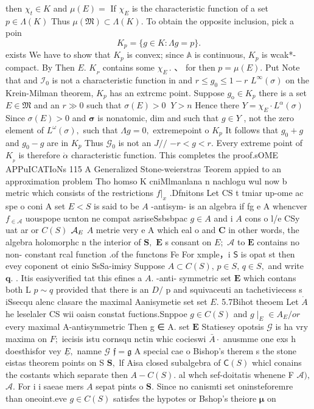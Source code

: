then $\scriptstyle\chi_{t}\in K$ and $\mu(E)=$ If $\chi_{E}$ is the characteristic function of a set $p\in\Lambda(K)$ Thus $\mu({\mathfrak{M}})\subset{\Lambda}(K).$ To obtain the opposite inclusion, pick a poin $$ K_{p}=\{g\in K\colon\Lambda g=p\}. $$ exists We have to show that $K_{p}$ is convex; since $\mathbb{A}$ is continuous, $K_{p}$ is wcak*-compact. By Then $\textstyle E.$ $K_{\!_{P}}$ contains some $\chi_{E}\,.$ 、 for then $p=\mu(E).$ Put Note that and ${\mathcal{I}}_{0}$ is not a characteristic function in and $r\leq g_{0}\leq1-r$ $L^{\infty}(\sigma)$ on the Krein-Milman theorem, $K_{p}$ has an extrcmc point. Suppose $g_{\mathrm{o}}\in K_{p}$ there is a set $E\in{\mathfrak{M}}$ and an $\scriptstyle{r\gg0}$ such that $\sigma(E)>0$ $\ Y>n$ Hence there $Y=\chi_{E}\cdot L^{\alpha}(\sigma)$ Since $\sigma(E)>0$ and $\textstyle{\boldsymbol{\sigma}}$ is nonatomic, dim and such that $g\in Y$ , not the zero element of $L^{\omega}(\sigma),$ such that $\Lambda g=0,$ extremepoint o $K_{p}$ It follows that $g_{0}+g$ and $g_{0}-g$ are in $K_{p}$ Thus ${\mathcal{G}}_{0}$ is not an $J/{\big/}$ $-r<g<r.$ Every extreme point of $K_{\!_{p}}$ is therefore $\scriptstyle{\dot{\alpha}}$ characteristic function. This completes the proof.sOME APPuICATIoNs 115 A Generalized Stone-weierstras Teorem appied to an approximation problem Tho homso K cniMlmanlana n nachlogu wul now b metric which consists of the restrictions $f|_{x}$ .Dfnitons Let CS t tmiar up-ome ac spe o coni A set $E<S$ is said to be $\textstyle A$ -antisym- is an algebra if fg e A whencver $f_{\in{\mathcal{A}}}$ uouspope ucnton ne compat asriseSsbsbpac $g\in A$ and i $\textstyle A$ cons o l/e CSy uat ar or $C(S)$ ${\cal A}_{E}$ $\textstyle{A}$ metrie very e A which eal o and ${\boldsymbol{C}}$ in other words, the algebra holomorphc n the interior of $\mathbf{S},$ ${\boldsymbol{E}}$ s consant on $E;$ $\textstyle{\mathcal{A}}$ to $\boldsymbol{E}$ contains no non- constant rcal function .of the functons Fe For xmple，i $\boldsymbol{\mathsf{S}}$ is opat st then evey coponent ot einio SsSa-imisy Suppose $A\subset C(S),\,p\in S,\,q\in S,$ and write ${\boldsymbol{q}}.$ . Itis easiyverified tat this efines a $A.$ -anti- symmetric set ${\boldsymbol{E}}$ which contans both L $p\sim q$ provided that there is an $D\!\!\!\!/$ p and squivaceuti an tachetiviecess s iSsecqu alenc clasare the maximal Aanisymetie set set $E.$ 5.7Bihot theoem Let $\dot{A}$ he leselaler CS wii oaisn constat fuctions.Snppoe $g\in C(S)$ and $g\mid_{E}\in A_{E}/o r$ every maximal A-antisymmetric Then g ∈ A. set ${\boldsymbol{E}}$ Statiesey opotsis $\scriptstyle{\mathcal{G}}$ is ha vry maxima on $F;$ iecisis istu cornsqu nctin whic cocieswi ${\bar{A}}\cdotp$ anusmme one exs h doesthisfor vey ${\underline{{E}}},$ namne $\mathcal{G}$ ${\mathfrak{f}}={\mathfrak{g}}$ A special cae o Bishop's therem s the stone eistas theorem points on S ${\boldsymbol{S}},$ lf Aisa closed subalgebra of ${\mathsf{C}}(S)$ whicl conains the costants which separate then $A-C(S).$ al whch sef-doitatis whenene F ${\mathcal{A}}),$ ${\mathcal{A}}.$ For i i saeae mers $\textstyle{A}$ sepat pints o $\mathbf{S}.$ Since no canismti set oninsteforemre than oneoint.eve $g\in C(S)$ satisfes the hypotes or Bshop's theiore $\boldsymbol{\mu}$ on 